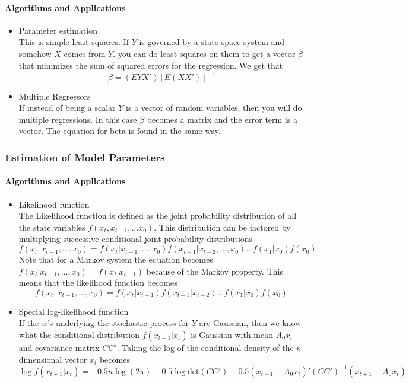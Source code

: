 \documentclass[11pt]{article}
\begin{document}
\paragraph{Algorithms and Applications}
\label{sec-1-1-4-1}
\begin{itemize}

\item Parameter estimation\\
\label{sec-1-1-4-1-1}%
This is simple least squares. If $Y$ is governed by a
      state-space system and somehow $X$ comes from $Y$. you can do
      least squares on them to get a vector $\beta$ that minimizes the
      sum of squared errors for the regression. We get that $$\beta =
      (EYX')[E(XX')]^{-1}$$

\item Multiple Regressors\\
\label{sec-1-1-4-1-2}%
If instead of being a scalar $Y$ is a vector of random
      variables, then you will do multiple regressions. In this case
      $\beta$ becomes a matrix and the error term is a vector. The
      equation for beta is found in the same way.
\end{itemize} %
\subsubsection{Estimation of Model Parameters}
\label{sec-1-1-5}
\paragraph{Algorithms and Applications}
\label{sec-1-1-5-1}
\begin{itemize}

\item Likelihood function\\
\label{sec-1-1-5-1-1}%
The Likelihood function is defined as the joint probability
      distribution of all the state variables $f(x_t, x_{t-1}, \dots
      x_0)$. This distribution can be factored by multiplying
      successive conditional joint probability distributions $$f(x_t,
      x_{t-1}, \dots, x_0) = f(x_t |x_{t-1}, \dots, x_0)
      f(x_{t-1}|x_{t-2}, \dots, x_0) \dots f(x_1|x_0)f(x_0)$$ Note
      that for a Markov system the equation becomes $f(x_t|x_{t-1},
      \dots, x_0) = f(x_t|x_{t-1})$ because of the Markov
      property. This means that the likelihood function becomes
      $$f(x_t, x_{t-1}, \dots, x_0) = f(x_t |x_{t-1})
      f(x_{t-1}|x_{t-2})\dots f(x_1|x_0)f(x_0)$$

\item Special log-likelihood function\\
\label{sec-1-1-5-1-2}%
If the $w$'s underlying the stochastic process for $Y$ are
      Gaussian, then we know what the conditional distribution
      $f(x_{t+1}|x_t)$ is Gaussian with mean $A_0x_t$ and covariance
      matrix $CC'$. Taking the log of the conditional density of the
      $n$ dimensional vector $x_t$ becomes $$\log f(x_{t+1}|x_t) =
      -0.5n \log(2 \pi) - 0.5 \log \text{det}(CC') - 0.5(x_{t+1} -
      A_0x_t)'(CC')^{-1}(x_{t+1} - A_0x_t)$$
\end{itemize} %
\end{document}
